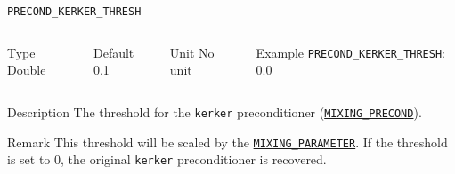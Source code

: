 \begin{frame}[allowframebreaks]{\texttt{PRECOND\_KERKER\_THRESH}} \label{PRECOND_KERKER_THRESH}
\vspace*{-12pt}
\begin{columns}
\begin{block}{Type}
Double
\end{block}

\begin{block}{Default}
0.1
\end{block}

\begin{block}{Unit}
No unit
\end{block}

\begin{block}{Example}
\texttt{PRECOND\_KERKER\_THRESH}: 0.0
\end{block}
\end{columns}

\begin{block}{Description}
The threshold for the \texttt{kerker} preconditioner (\hyperlink{MIXING_PRECOND}{\texttt{MIXING\_PRECOND}}).
\end{block}

\begin{block}{Remark}
This threshold will be scaled by the \hyperlink{MIXING_PARAMETER}{\texttt{MIXING\_PARAMETER}}. If the threshold is set to 0, the original \texttt{kerker} preconditioner is recovered.
\end{block}

\end{frame}



